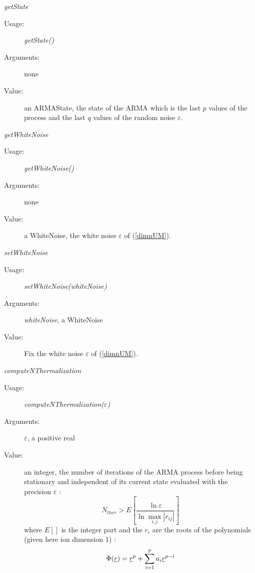 \begin{description}
\begin{description}
\item \textit{getState}
\begin{description}
\item[Usage:] \textit{getState()}
\item[Arguments:] none
\item[Value:] an ARMAState, the state of the ARMA  which is the last  $p$ values of the process and the last $q$ values of the  random noise $\varepsilon$.
\end{description}
\bigskip

\item \textit{getWhiteNoise}
\begin{description}
\item[Usage:] \textit{getWhiteNoise()}
\item[Arguments:] none
\item[Value:] a WhiteNoise,  the white noise $\varepsilon$ of (\ref{dimnUM}).
\end{description}
\bigskip

\item \textit{setWhiteNoise}
\begin{description}
\item[Usage:] \textit{setWhiteNoise(whiteNoise)}
\item[Arguments:] \textit{whiteNoise}, a WhiteNoise
\item[Value:] Fix the white noise $\varepsilon$ of (\ref{dimnUM}).
\end{description}
\bigskip

\item \textit{computeNThermalization}
\begin{description}
\item[Usage:] \textit{computeNThermalization($\varepsilon$)}
\item[Arguments:] \textit{$\varepsilon$}, a positive real
\item[Value:] an integer, the number of iterations of the ARMA process before being stationary and independent of its current state evaluated with the precision $\varepsilon$ :
\begin{equation}\label{nTher}
N_{ther} > E[ \displaystyle \frac{\ln  \varepsilon}{\ln \max_{i,j} |r_{ij}|}]
\end{equation}
where  $E[]$ is the integer part and the $r_i$ are the roots of the polynomials (given here ion dimension 1) :
\begin{equation}\label{PolPhi}
\Phi({\underline{r}}) = {\underline{r}}^p + \sum_{i=1}^p a_i{\underline{r}}^{p-i}
\end{equation}



\end{description}
\end{description}
\end{description}
